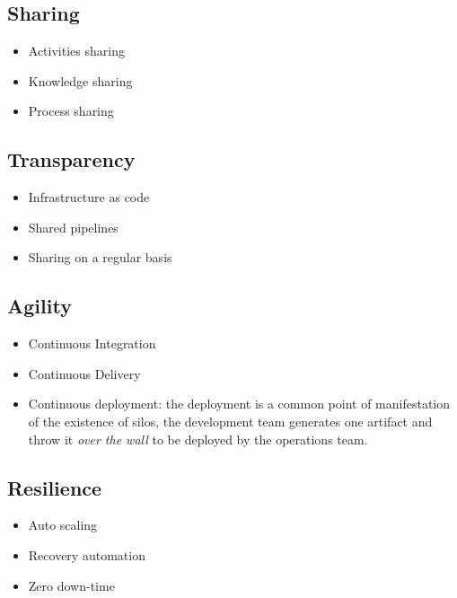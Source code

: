 \subsection{Sharing}
\begin{itemize}
\item Activities sharing
\item Knowledge sharing
\item Process sharing
\end{itemize}

\subsection{Transparency}
\begin{itemize}
\item Infrastructure as code
\item Shared pipelines
\item Sharing on a regular basis
\end{itemize}

\subsection{Agility}
\begin{itemize}
\item Continuous Integration
\item Continuous Delivery
\item Continuous deployment: the deployment is a common point of manifestation
of the existence of silos, the development team generates one artifact and
throw it \textit{over the wall} to be deployed by the operations team.
\end{itemize}

\subsection{Resilience}
\begin{itemize}
\item Auto scaling
\item Recovery automation
\item Zero down-time
\end{itemize}
